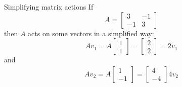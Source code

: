 \documentclass{beamer}
\begin{document}
\begin{frame}{Simplifying matrix actions}
	If
	\begin{equation*}
		A = \left[\begin{matrix}
			3 & -1\\
			-1 & 3
		\end{matrix}\right]
	\end{equation*}
	then $A$ acts on some vectors in a simplified way:
	\begin{equation*}
		A v_1 = 
		A \left[
		\begin{matrix}
		1\\
		1
		\end{matrix}
		\right] = \left[
		\begin{matrix}
		2\\
		2
		\end{matrix}
		\right] = 2v_1
	\end{equation*}
	and
	\begin{equation*}
	\begin{matrix}
	Av_2 =
	A \left[
	\begin{matrix}
	1\\
	-1
	\end{matrix}
	\right] = 
	\left[
	\begin{matrix}
	4\\
	-4
	\end{matrix}
	\right]
	4v_2
	\end{matrix}
	\end{equation*}
\end{frame}
\end{document}
